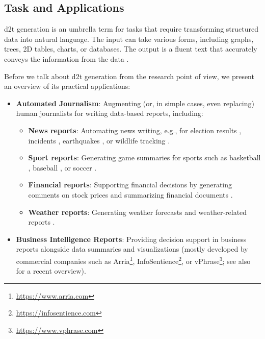 {\subsection{Task and Applications}
\label{sec:d2t-tasks}

\ac{d2t} generation is an umbrella term for tasks that require transforming structured data into natural language. The input can take various forms, including graphs, trees, 2D tables, charts, or databases. The output is a fluent text that accurately conveys the information from the data \cite{gattSurveyStateArt2018,sharmaInnovationsNeuralDatatotext2022}.

Before we talk about \ac{d2t} generation from the research point of view, we present an overview of its practical applications:

\begin{itemize}
    \item \textbf{Automated Journalism}: Augmenting (or, in simple cases, even replacing) human journalists for writing data-based reports, including:
          \begin{itemize}
              \item \textbf{News reports}: Automating news writing, e.g., for election results \cite{leppanen2017data}, incidents \cite{vanderleeCACAPODatasetMultilingual2020}, earthquakes \cite{oremus2014first}, or wildlife tracking \cite{siddharthan2012blogging,ponnamperuma2013tag2blog}.
              \item \textbf{Sport reports}: Generating game summaries for sports such as basketball \cite{wiseman2017challenges,thomson2020sportsett}, baseball \cite{puduppullyDatatotextGenerationEntity2019}, or soccer \cite{van2017pass}.
              \item \textbf{Financial reports}: Supporting financial decisions by generating comments on stock prices \cite{murakami2017learning,aoki2018generating} and summarizing financial documents \cite{chapman2022towards}.
              \item \textbf{Weather reports}: Generating weather forecasts and weather-related reports \cite{goldberg1994using,belz2005corpus,belz2008automatic,angeli-etal-2010-simple,balakrishnan2019constrained}.
          \end{itemize}
    \item \textbf{Business Intelligence Reports}: Providing decision support in business reports alongside data summaries and visualizations (mostly developed by commercial companies such as Arria\footnote{\url{https://www.arria.com}}, InfoSentience\footnote{\url{https://infosentience.com}}, or vPhrase\footnote{\url{https://www.vphrase.com}}; see also \citet{daleNavigatingTextGeneration2023} for a recent overview).

\end{itemize}}
